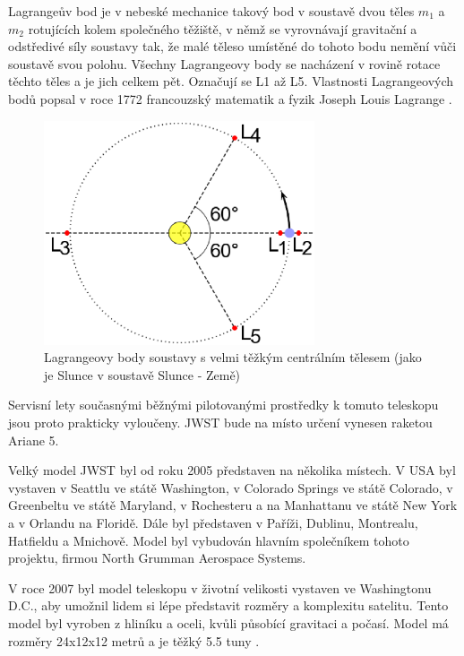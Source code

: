 \documentclass[a4paper,11pt]{article}
\begin{document}
Lagrangeův bod je v nebeské mechanice takový bod v soustavě dvou těles \begin{math}m_1\end{math} a \begin{math}m_2\end{math} rotujících kolem společného těžiště, v němž se vyrovnávají gravitační a odstředivé síly soustavy tak, že malé těleso umístěné do tohoto bodu nemění vůči soustavě svou polohu. Všechny Lagrangeovy body se nacházení v rovině rotace těchto těles a je jich celkem pět. Označují se L1 až L5. Vlastnosti Lagrangeových bodů popsal v roce 1772 francouzský matematik a fyzik Joseph Louis Lagrange \cite{lagrange}.
\begin{figure}[h]
\begin{center}
\includegraphics[width=8cm]{lagrange.eps}
\caption{Lagrangeovy body soustavy s velmi těžkým centrálním tělesem (jako je Slunce v soustavě Slunce - Země)}
\end{center}
\end{figure}

Servisní lety současnými běžnými pilotovanými prostředky k tomuto teleskopu jsou proto prakticky vyloučeny. JWST bude na místo určení vynesen raketou Ariane 5.

Velký model JWST byl od roku 2005 představen na několika místech. V USA byl vystaven v Seattlu ve státě Washington, v Colorado Springs ve státě Colorado, v Greenbeltu ve státě Maryland, v Rochesteru a na Manhattanu ve státě New York a v Orlandu na Floridě. Dále byl představen v Paříži, Dublinu, Montrealu, Hatfieldu a Mnichově. Model byl vybudován hlavním společníkem tohoto projektu, firmou North Grumman Aerospace Systems.

V roce 2007 byl model teleskopu v životní velikosti vystaven ve Washingtonu D.C., aby umožnil lidem si lépe představit rozměry a komplexitu satelitu. Tento model byl vyroben z hliníku a oceli, kvůli působící gravitaci a počasí. Model má rozměry 24x12x12 metrů a je těžký 5.5 tuny \cite{wikipediaWebbEn}.
\end{document}

